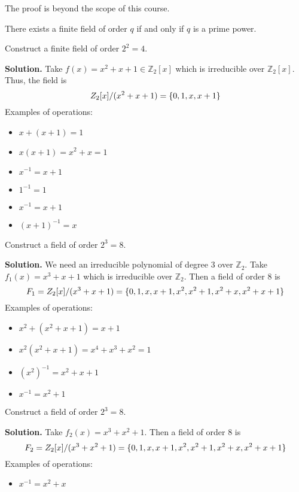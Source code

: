 The proof is beyond the scope of this course.

\begin{Theorem}{}{}
    There exists a finite field of order $ q $ if and only if
    $ q $ is a prime power.
\end{Theorem}

\begin{Example}{}{}
    Construct a finite field of order $ 2^2=4 $.

    \textbf{Solution.} Take $ f(x)=x^2+x+1\in\mathbb{Z}_2[x] $
    which is irreducible over $ \mathbb{Z}_2[x] $. Thus, the field is
    \[ \relax{Z}_2[x]/(x^2+x+1)=\{0,1,x,x+1\} \]
    Examples of operations:
    \begin{itemize}
        \item $ x+(x+1)=1 $
        \item $ x(x+1)=x^2+x=1 $
        \item $ x^{-1}=x+1 $
        \item $ 1^{-1}=1 $
        \item $ x^{-1}=x+1 $
        \item $ (x+1)^{-1}=x $
    \end{itemize}
\end{Example}

\begin{Example}{}{}
    Construct a field of order $ 2^3=8 $.

    \textbf{Solution.} We need an irreducible polynomial of degree $ 3 $
    over $ \mathbb{Z}_2 $. Take $ f_1(x)=x^3+x+1 $ which is
    irreducible over $ \mathbb{Z}_2 $. Then a field of order $ 8 $ is
    \[ F_1=\relax{Z}_2[x]/(x^3+x+1)=\{0,1,x,x+1,x^2,x^2+1,x^2+x,x^2+x+1\} \]
    Examples of operations:
    \begin{itemize}
        \item $ x^2+(x^2+x+1)=x+1 $
        \item $ x^2(x^2+x+1)=x^4+x^3+x^2=1 $
        \item $ (x^2)^{-1}=x^2+x+1 $
        \item $ x^{-1}=x^2+1 $
    \end{itemize}
\end{Example}



\begin{Example}{}{}
    Construct a field of order $ 2^3=8 $.

    \textbf{Solution.} Take $ f_2(x)=x^3+x^2+1 $. Then a field of order $ 8 $ is
    \[ F_2=\relax{Z}_2[x]/(x^3+x^2+1)=\{0,1,x,x+1,x^2,x^2+1,x^2+x,x^2+x+1\} \]
    Examples of operations:
    \begin{itemize}
        \item $ x^{-1}=x^2+x $
    \end{itemize}
\end{Example}

